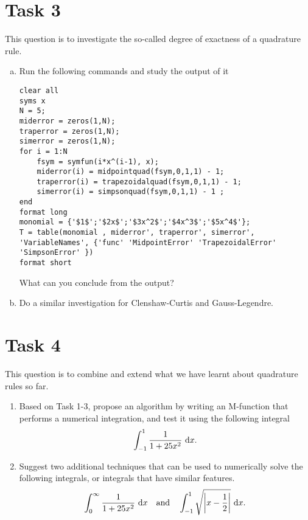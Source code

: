 \section*{Task 3}
This question is to investigate the so-called {\color{blue}degree of exactness} of a quadrature rule.
\begin{enumerate}[(a)]
	\item Run the following commands and study the output of it
	\begin{lstlisting}[style=Matlab-editor]
clear all
syms x
N = 5;
miderror = zeros(1,N);
traperror = zeros(1,N);
simerror = zeros(1,N);
for i = 1:N
	fsym = symfun(i*x^(i-1), x);
	miderror(i) = midpointquad(fsym,0,1,1) - 1;
	traperror(i) = trapezoidalquad(fsym,0,1,1) - 1;
	simerror(i) = simpsonquad(fsym,0,1,1) - 1 ;
end
format long
monomial = {'$1$';'$2x$';'$3x^2$';'$4x^3$';'$5x^4$'};
T = table(monomial , miderror', traperror', simerror', 'VariableNames', {'func' 'MidpointError' 'TrapezoidalError' 'SimpsonError' })
format short
	\end{lstlisting}
	What can you conclude from the output?
	\item Do a similar investigation for Clenshaw-Curtis and Gauss-Legendre.
\end{enumerate}


\section*{Task 4}
This question is to combine and extend what we have learnt about quadrature rules so far.
\begin{enumerate}
	\item Based on Task 1-3, propose an algorithm by writing an M-function that
performs a numerical integration, and test it using the following integral
	\[ \int_{-1}^{1}\frac{1}{1+25x^2}~\mathrm{d} x. \]
	\item  Suggest two additional techniques that can be used to numerically solve the
following integrals, or integrals that have similar features.
	\[ \int_{0}^{\infty}\frac{1}{1+25x^2}~\mathrm{d} x \quad \text{and} \quad \int_{-1}^{1}\sqrt{\left|x-\frac{1}{2}\right|}~\mathrm{d} x . \]

\end{enumerate}
